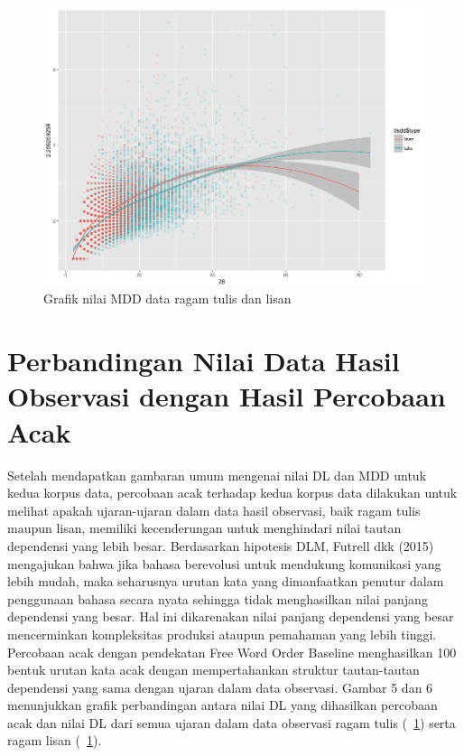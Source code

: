 \begin{figure}
	\centering \includegraphics[width=1
	\textwidth] {pics/lisantulis_MDD.png} 
	\caption{Grafik nilai MDD data ragam tulis dan lisan} 
\label{fig:lisantulis_MDD} 
\end{figure}

\section{Perbandingan Nilai Data Hasil Observasi dengan Hasil Percobaan Acak}
Setelah mendapatkan gambaran umum mengenai nilai DL dan MDD untuk kedua korpus data, percobaan acak terhadap kedua korpus data dilakukan untuk melihat apakah ujaran-ujaran dalam data hasil observasi, baik ragam tulis maupun lisan, memiliki kecenderungan untuk menghindari nilai tautan dependensi yang lebih besar. Berdasarkan hipotesis DLM, Futrell dkk (2015) mengajukan bahwa jika bahasa berevolusi untuk mendukung komunikasi yang lebih mudah, maka seharusnya urutan kata yang dimanfaatkan penutur dalam penggunaan bahasa secara nyata sehingga tidak menghasilkan nilai panjang dependensi yang besar. Hal ini dikarenakan nilai panjang dependensi yang besar mencerminkan kompleksitas produksi ataupun pemahaman yang lebih tinggi. Percobaan acak dengan pendekatan Free Word Order Baseline menghasilkan 100 bentuk urutan kata acak dengan mempertahankan struktur tautan-tautan dependensi yang sama dengan ujaran dalam data observasi. Gambar 5 dan 6 menunjukkan grafik perbandingan antara nilai DL yang dihasilkan percobaan acak dan nilai DL dari semua ujaran dalam data observasi ragam tulis (\pic~\ref{fig:lisantulis_MDD}) serta ragam lisan (\pic~\ref{fig:lisantulis_MDD}). 

